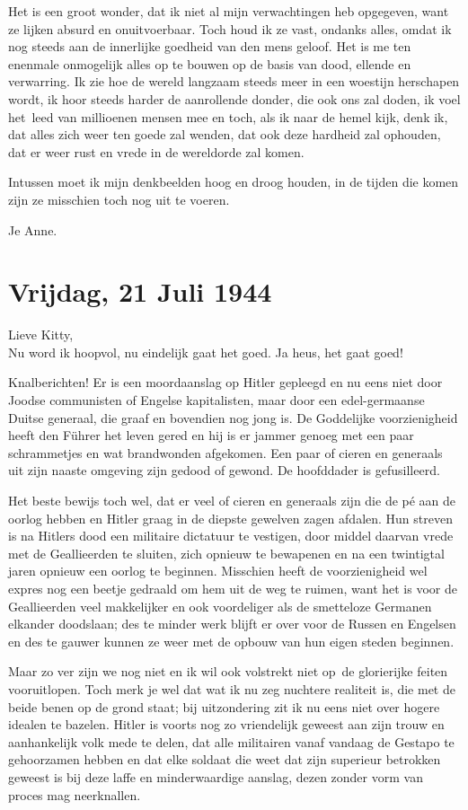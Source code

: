 \documentclass{book}
\begin{document}
Het is een groot wonder, dat ik niet al mijn verwachtingen heb
opgegeven, want ze lijken absurd en onuitvoerbaar. Toch houd ik ze vast,
ondanks alles, omdat ik nog steeds aan de innerlijke goedheid van den
mens geloof. Het is me ten enenmale onmogelijk alles op te bouwen op de
basis van dood, ellende en verwarring. Ik zie hoe de wereld langzaam
steeds meer in een woestijn herschapen wordt, ik hoor steeds harder de
aanrollende donder, die ook ons zal doden, ik voel het~leed van
millioenen mensen mee en toch, als ik naar de hemel kijk, denk ik, dat
alles zich weer ten goede zal wenden, dat ook deze hardheid zal
ophouden, dat er weer rust en vrede in de wereldorde zal komen.

Intussen moet ik mijn denkbeelden hoog en droog houden, in de tijden die
komen zijn ze misschien toch nog uit te voeren.

Je Anne.

\chapter{Vrijdag, 21 Juli 1944}

Lieve Kitty,\\Nu word ik hoopvol, nu eindelijk gaat het goed. Ja heus,
het gaat goed!

Knalberichten! Er is een moordaanslag op Hitler gepleegd en nu eens niet
door Joodse communisten of Engelse kapitalisten, maar door een
edel-germaanse Duitse generaal, die graaf en bovendien nog jong is. De
Goddelijke voorzienigheid heeft den Führer het leven gered en hij is er
jammer genoeg met een paar schrammetjes en wat brandwonden afgekomen.
Een paar of cieren en generaals uit zijn naaste omgeving zijn gedood of
gewond. De hoofddader is gefusilleerd.

Het beste bewijs toch wel, dat er veel of cieren en generaals zijn die
de pé aan de oorlog hebben en Hitler graag in de diepste gewelven zagen
afdalen. Hun streven is na Hitlers dood een militaire dictatuur te
vestigen, door middel daarvan vrede met de Geallieerden te sluiten, zich
opnieuw te bewapenen en na een twintigtal jaren opnieuw een oorlog te
beginnen. Misschien heeft de voorzienigheid wel expres nog een beetje
gedraald om hem uit de weg te ruimen, want het is voor de Geallieerden
veel makkelijker en ook voordeliger als de smetteloze Germanen elkander
doodslaan; des te minder werk blijft er over voor de Russen en Engelsen
en des te gauwer kunnen ze weer met de opbouw van hun eigen steden
beginnen.

Maar zo ver zijn we nog niet en ik wil ook volstrekt niet op~de
glorierijke feiten vooruitlopen. Toch merk je wel dat wat ik nu zeg
nuchtere realiteit is, die met de beide benen op de grond staat; bij
uitzondering zit ik nu eens niet over hogere idealen te bazelen. Hitler
is voorts nog zo vriendelijk geweest aan zijn trouw en aanhankelijk volk
mede te delen, dat alle militairen vanaf vandaag de Gestapo te
gehoorzamen hebben en dat elke soldaat die weet dat zijn superieur
betrokken geweest is bij deze laffe en minderwaardige aanslag, dezen
zonder vorm van proces mag neerknallen.
\end{document}
